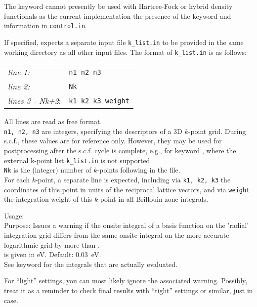 The  keyword cannot presently be used with 
Hartree-Fock or hybrid density functionals
as the current implementation the presence of the
 keyword and information in \texttt{control.in}.

If specified,  expects a separate input
file \texttt{k\_list.in} to be provided in the same working directory
as all other input files. The format of \texttt{k\_list.in} is as
follows: \\[1.0ex] 
\begin{tabular}{ll}
\emph{line 1:} & \texttt{n1   n2   n3} \\
\emph{line 2:} & \texttt{Nk} \\
\emph{lines 3 - Nk+2}: & \texttt{k1   k2   k3   weight} \\
\end{tabular}

All lines are read as free format. \\
\texttt{n1, n2, n3} are integers,
specifying the descriptors of a 3D $k$-point grid. During s.c.f.,
these values are for reference only. However, they may be used 
for postprocessing after the s.c.f. cycle is complete, e.g., for keyword 
, where the external k-point
list \texttt{k\_list.in} is not supported. \\
\texttt{Nk} is the (integer) number of $k$-points
following in the file. \\
For each $k$-point, a separate line is
expected, including via \texttt{k1, k2, k3} the coordinates of this
point in units of the reciprocal lattice vectors, and via
\texttt{weight} the integration weight of this $k$-point in all
Brillouin zone integrals.

{
  \noindent
  Usage:   \\[1.0ex]
  Purpose: Issues a warning if the onsite integral of a basis function on 
    the 'radial' integration grid differs from the same onsite integral on
    the more accurate logarithmic grid by more than . \\[1.0ex]
   is given in eV. Default: 0.03~eV. \\
}
See keyword  
for the integrals that are actually evaluated.

For ``light'' settings, you can most likely ignore the associated warning. 
Possibly, treat it as a reminder to check final results with ``tight'' 
settings or similar, just in case.

